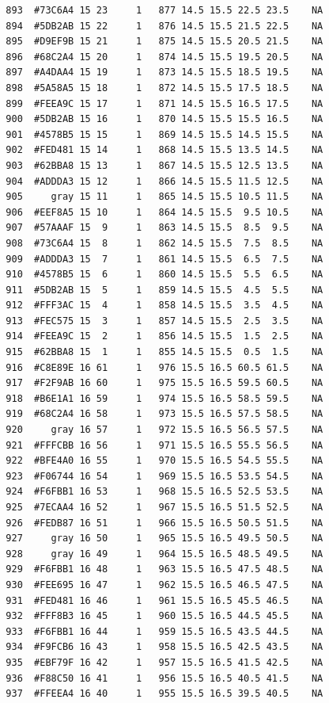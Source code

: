 \documentclass[12pt,twoside]{reedthesis}
\begin{document}
\begin{verbatim}
  893  #73C6A4 15 23     1   877 14.5 15.5 22.5 23.5    NA
  894  #5DB2AB 15 22     1   876 14.5 15.5 21.5 22.5    NA
  895  #D9EF9B 15 21     1   875 14.5 15.5 20.5 21.5    NA
  896  #68C2A4 15 20     1   874 14.5 15.5 19.5 20.5    NA
  897  #A4DAA4 15 19     1   873 14.5 15.5 18.5 19.5    NA
  898  #5A58A5 15 18     1   872 14.5 15.5 17.5 18.5    NA
  899  #FEEA9C 15 17     1   871 14.5 15.5 16.5 17.5    NA
  900  #5DB2AB 15 16     1   870 14.5 15.5 15.5 16.5    NA
  901  #4578B5 15 15     1   869 14.5 15.5 14.5 15.5    NA
  902  #FED481 15 14     1   868 14.5 15.5 13.5 14.5    NA
  903  #62BBA8 15 13     1   867 14.5 15.5 12.5 13.5    NA
  904  #ADDDA3 15 12     1   866 14.5 15.5 11.5 12.5    NA
  905     gray 15 11     1   865 14.5 15.5 10.5 11.5    NA
  906  #EEF8A5 15 10     1   864 14.5 15.5  9.5 10.5    NA
  907  #57AAAF 15  9     1   863 14.5 15.5  8.5  9.5    NA
  908  #73C6A4 15  8     1   862 14.5 15.5  7.5  8.5    NA
  909  #ADDDA3 15  7     1   861 14.5 15.5  6.5  7.5    NA
  910  #4578B5 15  6     1   860 14.5 15.5  5.5  6.5    NA
  911  #5DB2AB 15  5     1   859 14.5 15.5  4.5  5.5    NA
  912  #FFF3AC 15  4     1   858 14.5 15.5  3.5  4.5    NA
  913  #FEC575 15  3     1   857 14.5 15.5  2.5  3.5    NA
  914  #FEEA9C 15  2     1   856 14.5 15.5  1.5  2.5    NA
  915  #62BBA8 15  1     1   855 14.5 15.5  0.5  1.5    NA
  916  #C8E89E 16 61     1   976 15.5 16.5 60.5 61.5    NA
  917  #F2F9AB 16 60     1   975 15.5 16.5 59.5 60.5    NA
  918  #B6E1A1 16 59     1   974 15.5 16.5 58.5 59.5    NA
  919  #68C2A4 16 58     1   973 15.5 16.5 57.5 58.5    NA
  920     gray 16 57     1   972 15.5 16.5 56.5 57.5    NA
  921  #FFFCBB 16 56     1   971 15.5 16.5 55.5 56.5    NA
  922  #BFE4A0 16 55     1   970 15.5 16.5 54.5 55.5    NA
  923  #F06744 16 54     1   969 15.5 16.5 53.5 54.5    NA
  924  #F6FBB1 16 53     1   968 15.5 16.5 52.5 53.5    NA
  925  #7ECAA4 16 52     1   967 15.5 16.5 51.5 52.5    NA
  926  #FEDB87 16 51     1   966 15.5 16.5 50.5 51.5    NA
  927     gray 16 50     1   965 15.5 16.5 49.5 50.5    NA
  928     gray 16 49     1   964 15.5 16.5 48.5 49.5    NA
  929  #F6FBB1 16 48     1   963 15.5 16.5 47.5 48.5    NA
  930  #FEE695 16 47     1   962 15.5 16.5 46.5 47.5    NA
  931  #FED481 16 46     1   961 15.5 16.5 45.5 46.5    NA
  932  #FFF8B3 16 45     1   960 15.5 16.5 44.5 45.5    NA
  933  #F6FBB1 16 44     1   959 15.5 16.5 43.5 44.5    NA
  934  #F9FCB6 16 43     1   958 15.5 16.5 42.5 43.5    NA
  935  #EBF79F 16 42     1   957 15.5 16.5 41.5 42.5    NA
  936  #F88C50 16 41     1   956 15.5 16.5 40.5 41.5    NA
  937  #FFEEA4 16 40     1   955 15.5 16.5 39.5 40.5    NA

\end{verbatim}
\end{document}
